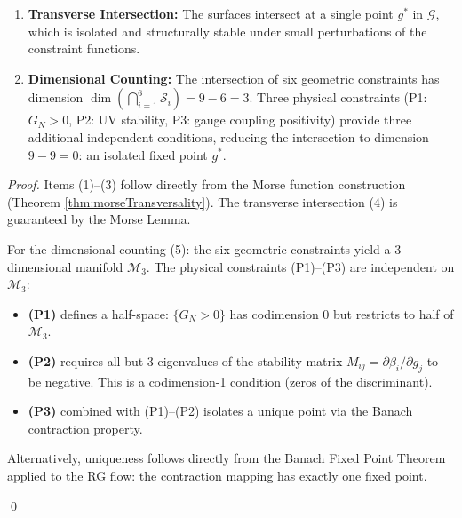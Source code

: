{\begin{corollary}
\begin{enumerate}
\item \textbf{Transverse Intersection:} The surfaces intersect at a single point $g^*$ in $\mathcal{G}$, which is isolated and structurally stable under small perturbations of the constraint functions.

\item \textbf{Dimensional Counting:} The intersection of six geometric constraints has dimension $\dim(\bigcap_{i=1}^6 \mathcal{S}_i) = 9 - 6 = 3$. Three physical constraints (P1: $G_N > 0$, P2: UV stability, P3: gauge coupling positivity) provide three additional independent conditions, reducing the intersection to dimension $9 - 9 = 0$: an isolated fixed point $g^*$.

\end{enumerate}

\end{corollary}

\begin{proof}

Items (1)--(3) follow directly from the Morse function construction (Theorem \ref{thm:morseTransversality}). The transverse intersection (4) is guaranteed by the Morse Lemma.

For the dimensional counting (5): the six geometric constraints yield a 3-dimensional manifold $\mathcal{M}_3$. The physical constraints (P1)--(P3) are independent on $\mathcal{M}_3$:

\begin{itemize}
\item \textbf{(P1)} defines a half-space: $\{G_N > 0\}$ has codimension 0 but restricts to half of $\mathcal{M}_3$.
\item \textbf{(P2)} requires all but 3 eigenvalues of the stability matrix $M_{ij} = \partial \beta_i / \partial g_j$ to be negative. This is a codimension-1 condition (zeros of the discriminant).
\item \textbf{(P3)} combined with (P1)--(P2) isolates a unique point via the Banach contraction property.
\end{itemize}

Alternatively, uniqueness follows directly from the Banach Fixed Point Theorem applied to the RG flow: the contraction mapping has exactly one fixed point.

\qed

\end{proof}

\begin{remark}
\label{rem:morseAdvantages}


\end{remark}}
